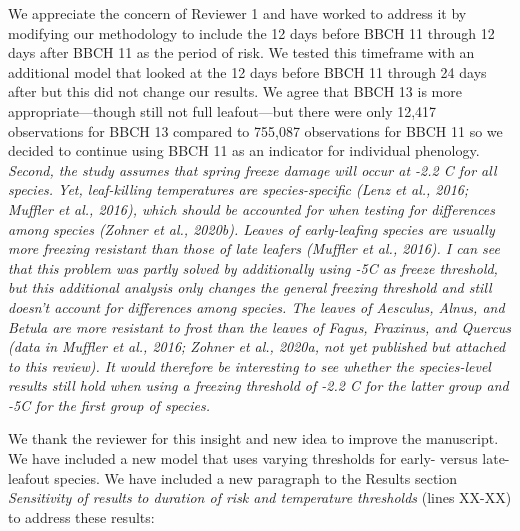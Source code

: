 \documentclass[11pt,a4paper]{article}
\begin{document}
We appreciate the concern of Reviewer 1 and have worked to address it by modifying our methodology to include the 12 days before BBCH 11 through 12 days after BBCH 11 as the period of risk. We tested this timeframe with an additional model that looked at the 12 days before BBCH 11 through 24 days after but this did not change our results. We agree that BBCH 13 is more appropriate---though still not full leafout---but there were only 12,417 observations for BBCH 13 compared to 755,087 observations for BBCH 11 so we decided to continue using BBCH 11 as an indicator for individual phenology. \\

\textit{Second, the study assumes that spring freeze damage will occur at -2.2 C for all species. Yet, leaf-killing temperatures are species-specific (Lenz et al., 2016; Muffler et al., 2016), which should be accounted for when testing for differences among species (Zohner et al., 2020b). Leaves of early-leafing species are usually more freezing resistant than those of late leafers (Muffler et al., 2016). I can see that this problem was partly solved by additionally using -5C as freeze threshold, but this additional analysis only changes the general freezing threshold and still doesn’t account for differences among species. The leaves of Aesculus, Alnus, and Betula are more resistant to frost than the leaves of Fagus, Fraxinus, and Quercus (data in Muffler et al., 2016; Zohner et al., 2020a, not yet published but attached to this review). It would therefore be interesting to see whether the species-level results still hold when using a freezing threshold of -2.2 C for the latter group and -5C for the first group of species.}

We thank the reviewer for this insight and new idea to improve the manuscript. We have included a new model that uses varying thresholds for early- versus late-leafout species. We have included a new paragraph to the Results section \textit*{Sensitivity of results to duration of risk and temperature thresholds} (lines XX-XX) to address these results:
\end{document}
